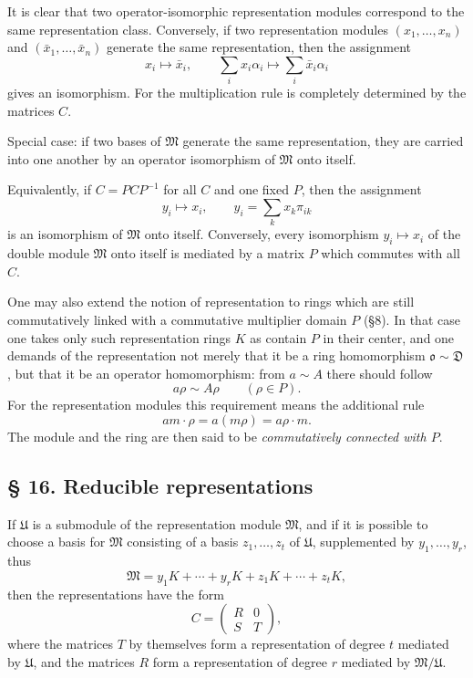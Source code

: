 \documentclass[11pt]{article}
\providecommand{\mM}{\mathfrak{M}}
\providecommand{\mU}{\mathfrak{U}}
\providecommand{\mo}{\mathfrak{o}}
\begin{document}
It is clear that two operator-isomorphic representation modules correspond to the same representation class. Conversely, if two representation modules $(x_1,\ldots,x_n)$ and $(\bar x_1,\ldots,\bar x_n)$ generate the same representation, then the assignment
\[
        x_i\mapsto \bar x_i,
        \qquad
        \sum_i x_i\alpha_i\mapsto \sum_i \bar x_i\alpha_i
\]
gives an isomorphism. For the multiplication rule is completely determined by the matrices $C$.

Special case: if two bases of $\mM$ generate the same representation, they are carried into one another by an operator isomorphism of $\mM$ onto itself.

Equivalently, if $C=PCP^{-1}$ for all $C$ and one fixed $P$, then the assignment
\[
        y_i\mapsto x_i,
        \qquad
        y_i=\sum_k x_k\pi_{ik}
\]
is an isomorphism of $\mM$ onto itself. Conversely, every isomorphism $y_i\mapsto x_i$ of the double module $\mM$ onto itself is mediated by a matrix $P$ which commutes with all $C$.

One may also extend the notion of representation to rings which are still commutatively linked with a commutative multiplier domain $P$ (§8). In that case one takes only such representation rings $K$ as contain $P$ in their center, and one demands of the representation not merely that it be a ring homomorphism $\mo\sim\mathfrak D$, but that it be an operator homomorphism: from $a\sim A$ there should follow
\[
        a\rho\sim A\rho\qquad(\rho\in P).
\]
For the representation modules this requirement means the additional rule
\[
        am\cdot\rho=a(m\rho)=a\rho\cdot m.
\]
The module and the ring are then said to be \emph{commutatively connected with $P$}.

\subsection*{§ 16. Reducible representations}
If $\mU$ is a submodule of the representation module $\mM$, and if it is possible to choose a basis for $\mM$ consisting of a basis $z_1,\ldots,z_t$ of $\mU$, supplemented by $y_1,\ldots,y_r$, thus
\[
        \mM=y_1K+\cdots+y_rK+z_1K+\cdots+z_tK,        \tag{2a}
\]
then the representations have the form
\[
        C=\begin{pmatrix}R&0\\ S&T\end{pmatrix},
\]
where the matrices $T$ by themselves form a representation of degree $t$ mediated by $\mU$, and the matrices $R$ form a representation of degree $r$ mediated by $\mM/\mU$.
\end{document}
